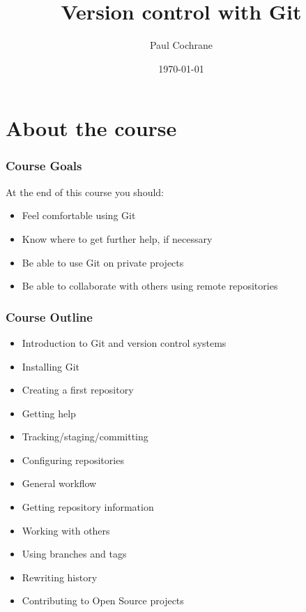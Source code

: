 \documentclass{git_course}
\begin{document}
\author{Paul Cochrane}
\title[Version control with Git]
        {Version control with Git}
\date{\today}

\maketitle

\begin{frame}
\begin{multicols}{2}
\begin{spacing}{0.8}
\tableofcontents
\end{spacing}
\end{multicols}
\end{frame}


\section{About the course}

\begin{frame}
\frametitle{Course Goals}

At the end of this course you should:

\begin{itemize}
    \item Feel comfortable using Git
    \item Know where to get further help, if necessary
    \item Be able to use Git on private projects
    \item Be able to collaborate with others using remote repositories
\end{itemize}
\end{frame}

\begin{frame}
\frametitle{Course Outline}
\begin{itemize}
    \item Introduction to Git and version control systems
    \item Installing Git
    \item Creating a first repository
    \item Getting help
    \item Tracking/staging/committing
    \item Configuring repositories
    \item General workflow
    \item Getting repository information
    \item Working with others
    \item Using branches and tags
    \item Rewriting history
    \item Contributing to Open Source projects
\end{itemize}
\end{frame}
\end{document}
